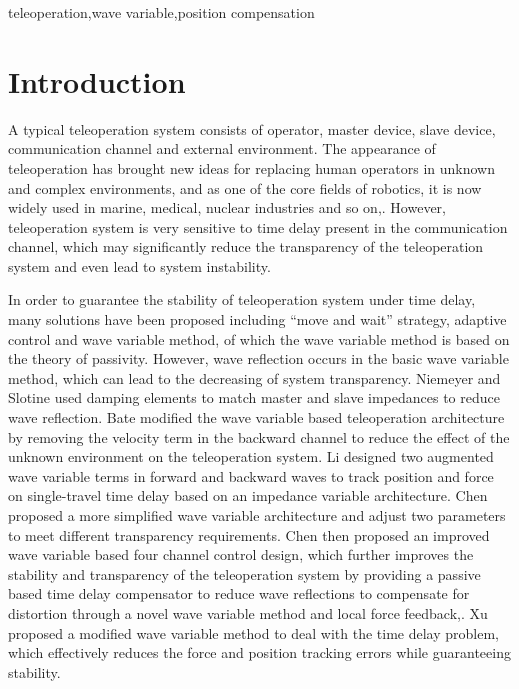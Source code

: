 \begin{IEEEkeywords}
    teleoperation,wave variable,position compensation
\end{IEEEkeywords}

\section{Introduction}
A typical teleoperation system consists of operator,
master device, slave device, communication channel and external environment.
The appearance of teleoperation has brought new ideas
for replacing human operators in unknown and complex environments,
and as one of the core fields of robotics,
it is now widely used in marine, medical,
nuclear industries and so on\cite{b1},\cite{b2}.
However,
teleoperation system is very sensitive to time delay present in the communication channel,
which may significantly reduce the transparency of the teleoperation system
and even lead to system instability\cite{b3}.
\par In order to guarantee the stability of teleoperation system under time delay,
many solutions have been proposed including ``move and wait'' strategy\cite{b4}, adaptive control and
wave variable method, of which the wave variable method is based on the theory of passivity\cite{b5}.
However, wave reflection occurs in the basic wave variable method,
which can lead to the decreasing  of system transparency.
Niemeyer and Slotine used damping elements to match master
and slave impedances to reduce wave reflection\cite{b6}.
Bate modified the wave variable based teleoperation architecture
by removing the velocity term in the backward channel
to reduce the effect of the unknown environment on the teleoperation system\cite{b7}.
Li designed two augmented wave variable terms in forward and backward waves
to track position and force on single-travel time delay
based on an impedance variable architecture\cite{b8}.
Chen proposed a more simplified wave variable architecture
and adjust two parameters to meet different transparency requirements.
Chen then proposed an improved wave variable based four channel control design,
which further improves the stability and transparency of the teleoperation system
by providing a passive based time delay compensator to reduce wave reflections
to compensate for distortion through a novel wave variable method
and local force feedback\cite{b9},\cite{b10}.
Xu proposed a modified wave variable method to deal with the time delay problem,
which effectively reduces the force and position tracking errors while guaranteeing stability\cite{b11}.
